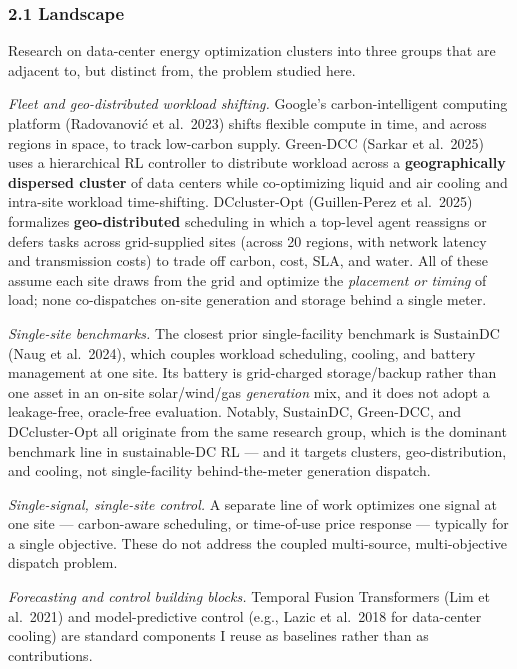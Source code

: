\documentclass[
  11pt,
]{article}
\newcounter{none} %
\begin{document}
\subsubsection{2.1 Landscape}\label{landscape}

Research on data-center energy optimization clusters into three groups
that are adjacent to, but distinct from, the problem studied here.

\emph{Fleet and geo-distributed workload shifting.} Google's
carbon-intelligent computing platform (Radovanović et al.~2023) shifts
flexible compute in time, and across regions in space, to track
low-carbon supply. Green-DCC (Sarkar et al.~2025) uses a hierarchical RL
controller to distribute workload across a \textbf{geographically
dispersed cluster} of data centers while co-optimizing liquid and air
cooling and intra-site workload time-shifting. DCcluster-Opt
(Guillen-Perez et al.~2025) formalizes \textbf{geo-distributed}
scheduling in which a top-level agent reassigns or defers tasks across
grid-supplied sites (across 20 regions, with network latency and
transmission costs) to trade off carbon, cost, SLA, and water. All of
these assume each site draws from the grid and optimize the
\emph{placement or timing} of load; none co-dispatches on-site
generation and storage behind a single meter.

\emph{Single-site benchmarks.} The closest prior single-facility
benchmark is SustainDC (Naug et al.~2024), which couples workload
scheduling, cooling, and battery management at one site. Its battery is
grid-charged storage/backup rather than one asset in an on-site
solar/wind/gas \emph{generation} mix, and it does not adopt a
leakage-free, oracle-free evaluation. Notably, SustainDC, Green-DCC, and
DCcluster-Opt all originate from the same research group, which is the
dominant benchmark line in sustainable-DC RL --- and it targets
clusters, geo-distribution, and cooling, not single-facility
behind-the-meter generation dispatch.

\emph{Single-signal, single-site control.} A separate line of work
optimizes one signal at one site --- carbon-aware scheduling, or
time-of-use price response --- typically for a single objective. These
do not address the coupled multi-source, multi-objective dispatch
problem.

\emph{Forecasting and control building blocks.} Temporal Fusion
Transformers (Lim et al.~2021) and model-predictive control (e.g., Lazic
et al.~2018 for data-center cooling) are standard components I reuse as
baselines rather than as contributions.
\end{document}
